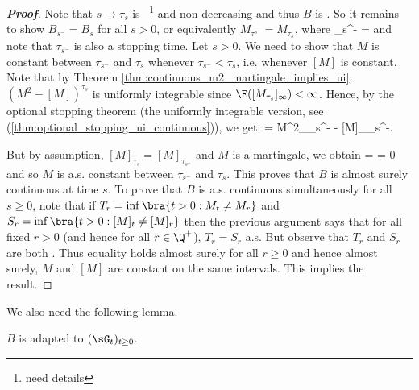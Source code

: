 \begin{proof}[\bf Proof]
Note that $s \to \tau_s$ is \cadlag\ \footnote{need details} and non-decreasing and thus $B$ is \cadlag. So it remains to show $B_{s^-} = B_s$ for all $s > 0$, or equivalently $M_{\tau^{s^-}} = M_{\tau_s}$, where 
\be
\tau_{s^-} = \inf{}
\ee
and note that $\tau_{s^-}$ is also a stopping time. Let $s > 0$. We need to show that $M$ is constant between $\tau_{s^-}$ and $\tau_s$ whenever $\tau_{s^-} < \tau_s$, i.e. whenever $[M]$ is constant. Note that by Theorem \ref{thm:continuous_m2_martingale_implies_ui}, $(M^2 - [M])^{\tau_s}$ is uniformly integrable since $\E([M_{\tau_s} ]_\infty) < \infty$. Hence, by the optional stopping theorem (the uniformly integrable version, see (\ref{thm:optional_stopping_ui_continuous})), we get:
\be
\E{} = M^2_{\tau_{s^-}} - [M]_{\tau_{s^-}}.
\ee

But by assumption, $[M]_{\tau_s} = [M]_{\tau_{s^-}}$ and $M$ is a martingale, we obtain
\be
\E{} = \E{} = 0
\ee
and so $M$ is a.s. constant between $\tau_{s^-}$ and $\tau_s$. This proves that $B$ is almost surely continuous at time $s$. To prove that $B$ is a.s. continuous simultaneously for all $s \geq 0$, note that if $T_r = \inf\bra{t > 0 : M_t \neq M_r}$ and $S_r = \inf\bra{t > 0: [M]_t \neq [M]_r}$ then the previous argument says that for all fixed $r > 0$ (and hence for all $r \in \Q^+$), $T_r = S_r$ a.s. But observe that $T_r$ and $S_r$ are both \cadlag. Thus equality holds almost surely for all $r \geq 0$ and hence almost surely, $M$ and $[M]$ are constant on the same intervals. This implies the result.
\end{proof}

We also need the following lemma.

\begin{lemma}
$B$ is adapted to $(\sG_t)_{t\geq0}$.
\end{lemma}

